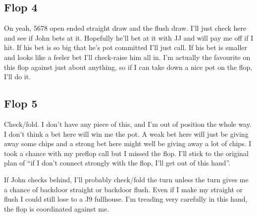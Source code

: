 \subsection*{Flop 4}

\begin{cards}
\crdsevh\crdtwoc\crdfivec%
\end{cards}

On yeah, 5678 open ended straight draw and the flush draw. I'll just check here and
see if John bets at it. Hopefully he'll bet at it with JJ and
will pay me off if I hit. If his bet is so big that he's pot
committed I'll just call. If his bet is smaller and looks like
a feeler bet I'll check-raise him all in. I'm actually the
favourite on this flop against just about anything, so if I
can take down a nice pot on the flop, I'll do it.

\subsection*{Flop 5}

\begin{cards}
\crdJh\crdnineh\crdninec%
\end{cards}

Check/fold. I don't have any piece of this, and I'm out of
position the whole way. I don't think a bet here will win me
the pot. A weak bet here will just be giving away some chips
and a strong bet here might well be giving away a lot of chips.
I took a chance with my preflop call but I missed the flop.
I'll stick to the original plan of ``if I don't connect strongly with
the flop, I'll get out of this hand''.

If John checks behind, I'll probably check/fold the
turn unless the turn gives me a chance of backdoor straight
or backdoor flush. Even if I make my straight or flush I could
still lose to a J9 fullhouse. I'm treading very carefully in
this hand, the flop is coordinated against me.


